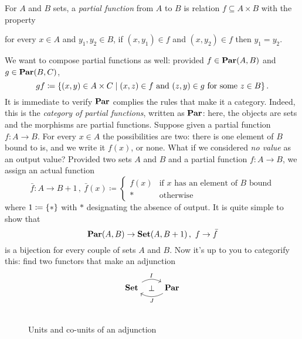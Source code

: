 \begin{exercise}
For \(A\) and \(B\) sets, a {\em partial function} from \(A\) to \(B\) is relation \(f \subseteq A \times B\) with the property
\begin{center}
for every \(x \in A\) and \(y_1, y_2 \in B\), if \((x, y_1) \in f\) and \((x, y_2) \in f\) then \(y_1 = y_2\).
\end{center}
We want to compose partial functions as well: provided \(f \in \mathbf{Par}(A, B)\) and \(g \in \mathbf{Par}(B, C)\),
\[gf \coloneq \left\{(x, y) \in A \times C \mid (x, z) \in f \text{ and } (z, y) \in g \text{ for some } z \in B\right\} .\]
It is immediate to verify \(\mathbf{Par}\) complies the rules that make it a category. Indeed, this is the {\em category of partial functions}, written as \(\mathbf{Par}\): here, the objects are sets and the morphisms are partial functions.\newline
Suppose given a partial function \(f : A \to B\). For every \(x \in A\) the possibilities are two: there is one element of \(B\) bound to is, and we write it \(f(x)\), or none. What if we considered {\em no value} as an output value? Provided two sets \(A\) and \(B\) and a partial function \(f : A \to B\), we assign an actual function
\[\bar f : A \to B+1 \,, \ \bar f(x) \coloneq \begin{cases} f(x) & \text{if \(x\) has an element of \(B\) bound} \\ \ast & \text{otherwise} \end{cases}\]
where \(1 \coloneq \left\{\ast\right\}\) with \(\ast\) designating the absence of output. It is quite simple to show that
\[\mathbf{Par}(A, B) \to \mathbf{Set}(A, B+1)\,,\ f \to \bar f\]
is a bijection for every couple of sets \(A\) and \(B\). Now it's up to you to categorify this: find two functors that make an adjunction
\[\begin{tikzcd}
\Set \ar["I"{name=I}, r, bend left] & \Par \ar["J"{name=J}, l, bend left]
\ar["\perp"{description}, phantom, from=I, to=J]
\end{tikzcd}\]
\end{exercise}

\begin{figure}
\centering
\begin{tabular}{c}
 \\ 
\midrule

\end{tabular}
\caption{Units and co-units of an adjunction}
\end{figure}

